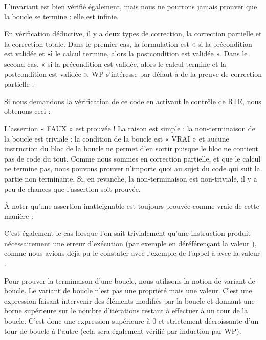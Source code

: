 L'invariant est bien vérifié également, mais nous ne pourrons jamais prouver
que la boucle se termine : elle est infinie.





En vérification déductive, il y a deux types de correction, la correction
partielle et la correction totale. Dans le premier cas, la formulation est
« si la précondition est validée et \textbf{si} le calcul termine, alors la
postcondition est validée ». Dans le second cas, « si la précondition est
validée, alors le calcul termine et la postcondition est validée ». WP
s'intéresse par défaut à de la preuve de correction partielle :





Si nous demandons la vérification de ce code en activant le contrôle de RTE,
nous obtenons ceci :





L'assertion « FAUX » est prouvée ! La raison est simple : la non-terminaison de
la boucle est triviale : la condition de la boucle est « VRAI » et aucune instruction
du bloc de la boucle ne permet d'en sortir puisque le bloc ne contient pas de code du
tout. Comme nous sommes en correction partielle, et que le calcul ne termine pas, nous
pouvons prouver n'importe quoi au sujet du code qui suit la partie non terminante. Si,
en revanche, la non-terminaison est non-triviale, il y a peu de chances que l'assertion
soit prouvée.



\begin{Information}
À noter qu'une assertion inatteignable est toujours prouvée comme vraie de cette
manière :

C'est également le cas lorsque l'on sait trivialement qu'une instruction
produit nécessairement une erreur d'exécution (par exemple en déréférençant
la valeur ), comme nous avions déjà pu le constater avec l'exemple
de l'appel à  avec la valeur .
\end{Information}


Pour prouver la terminaison d'une boucle, nous utilisons la notion de variant de
boucle. Le variant de boucle n'est pas une propriété mais une valeur. C'est une
expression faisant intervenir des éléments modifiés par la boucle et donnant une
borne supérieure sur le nombre d'itérations restant à effectuer à un tour de la
boucle. C'est donc une expression supérieure à 0 et strictement décroissante d'un
tour de boucle à l'autre (cela sera également vérifié par induction par WP).



